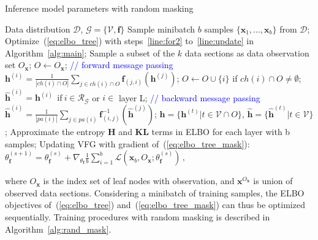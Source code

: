 \documentclass[twoside]{article}
\begin{document}
\begin{algorithm}[t]
   \caption{Inference model parameters with random masking}
   \label{alg:rand_mask}
\begin{algorithmic}[1]
    Data distribution $\mathcal{D}$,  $\mathcal{G} = \{\mathcal{V}, \mathbf{f}\}$
   \STATE  Sample minibatch $b$ samples $\{\mathbf{x}_1, ..., \mathbf{x}_b \}$ from $\mathcal{D}$;
   \STATE  
    Optimize~(\ref{eq:elbo_tree}) with steps~\ref{line:for2} to~\ref{line:update} in Algorithm~\ref{alg:main};
    \STATE  Sample a subset of the $k$ data sections as data observation set $O_{\mathbf{x}}$; $O \leftarrow O_{\mathbf{x}}$;
    \STATE  \textcolor{blue}{// forward message passing}
   \STATE $\mathbf{h}^{(i)} = \frac{1}{|ch(i) \cap O |} \sum_{j \in ch(i) \cap O} \mathbf{f}_{(j,i)}(\mathbf{h}^{(j)})$; 
     \STATE  $O \leftarrow O \cup \{i\}$ if $ch(i) \cap O \neq \emptyset $; 
    \ENDFOR
    \STATE $\widehat{\mathbf{h}}^{(i)} = \mathbf{h}^{(i)} \ \  \text{if} \ i \in \mathcal{R}_{\mathcal{G}} $ or $i \in$ layer L;
   \STATE \textcolor{blue}{// backward message passing}
   \STATE $\widehat{\mathbf{h}}^{(i)} = \frac{1}{|pa(i)|} \sum_{j \in pa(i) } \mathbf{f}^{-1}_{ (i,j)}(\widehat{\mathbf{h}}^{(j)}) $;%
   \ENDFOR
    \STATE  $\mathbf{h} =  \{\mathbf{h}^{(t)} \big |  t \in \mathcal{V} \cap O \}$, $\widehat{\mathbf{h}} =  \{\widehat{\mathbf{h}}^{(t)} \big | t \in \mathcal{V} \}$;
    \STATE Approximate the entropy $\mathbf{H}$ and $\mathbf{KL}$ terms in ELBO for each layer with b samples;
    \STATE Updating VFG with gradient of~(\ref{eq:elbo_tree_mask}): $\theta^{(s+1)}_{\mathbf{f}} = \theta^{(s)}_{\mathbf{f}} + \nabla_{\theta_{\mathbf{f}}}\frac{1}{b} \sum_{i=1}^b  \mathcal{L}(\mathbf{x}_b, O_{\mathbf{x}}; \theta^{(s)}_{\mathbf{f}})   \, ,$
   \ENDFOR
\end{algorithmic}
\end{algorithm}

where $O_{\mathbf{x}}$ is the index set of leaf nodes  with observation, and $\mathbf{x}^{O_{\mathbf{x}}}$ is union of observed data sections. 
Considering a minibatch of training samples, the ELBO objectives of~(\ref{eq:elbo_tree})
and~(\ref{eq:elbo_tree_mask}) can thus be optimized sequentially. 
Training procedures with random masking is described in Algorithm~\ref{alg:rand_mask}. 
\end{document}
